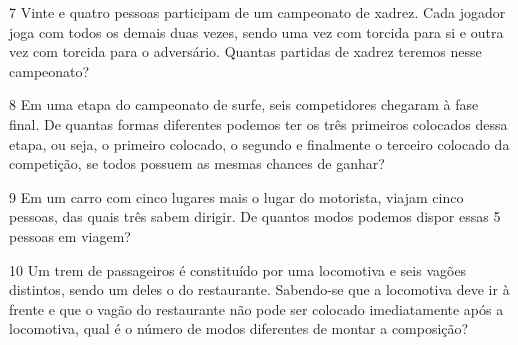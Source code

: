 \begin{mdframed}[linewidth=2pt,linecolor=salmao,roundcorner=2pt]
\begin{escolha}
{\begin{escolha}
\begin{mdframed}[linewidth=2pt,linecolor=salmao,roundcorner=2pt]
\vspace{2cm}
\end{mdframed}


\num{7} Vinte e quatro pessoas participam de um campeonato de xadrez. Cada jogador joga com todos os demais duas vezes, sendo uma vez com
torcida para si e outra vez com torcida para o adversário. Quantas partidas
de xadrez teremos nesse campeonato?

\begin{mdframed}[linewidth=2pt,linecolor=salmao,roundcorner=2pt]
\vspace{2cm}
\end{mdframed}

\num{8} Em uma etapa do campeonato de surfe, seis competidores chegaram à fase
final. De quantas formas diferentes podemos ter os três primeiros
colocados dessa etapa, ou seja, o primeiro colocado, o segundo e
finalmente o terceiro colocado da competição, se todos
possuem as mesmas chances de ganhar?

\begin{mdframed}[linewidth=2pt,linecolor=salmao,roundcorner=2pt]
\vspace{2cm}
\end{mdframed}

\num{9} Em um carro com cinco lugares mais o lugar do motorista, viajam cinco pessoas,
das quais três sabem dirigir. De quantos modos podemos dispor essas 5
pessoas em viagem?

\begin{mdframed}[linewidth=2pt,linecolor=salmao,roundcorner=2pt]
\vspace{2cm}
\end{mdframed}

\num{10} Um trem de passageiros é constituído por uma locomotiva e seis vagões
distintos, sendo um deles o do restaurante. Sabendo-se que a locomotiva deve ir
à frente e que o vagão do restaurante não pode ser colocado imediatamente
após a locomotiva, qual é o número de modos diferentes de montar a
composição?


\end{escolha}}
\end{escolha}
\end{mdframed}
